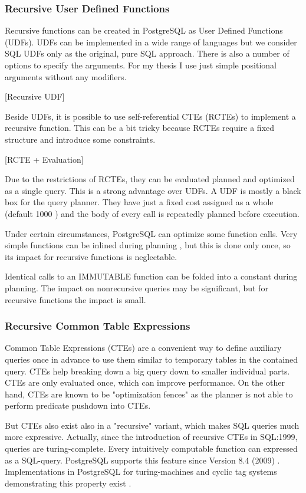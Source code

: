 \subsubsection{Recursive User Defined Functions}
Recursive functions can be created in PostgreSQL as User Defined Functions (UDFs). UDFs can be implemented in a wide range of languages but we consider SQL UDFs only as the original, pure SQL approach. There is also a number of options to specify the arguments. For my thesis I use just simple positional arguments without any modifiers.

[Recursive UDF]

Beside UDFs, it is possible to use self-referential CTEs (RCTEs) to implement a recursive function. This can be a bit tricky because RCTEs require a fixed structure and introduce some constraints.

[RCTE + Evaluation]

Due to the restrictions of RCTEs, they can be evaluated planned and optimized as a single query. This is a strong advantage over UDFs. A UDF is mostly a black box for the query planner. They have just a fixed cost assigned as a whole (default 1000 \cite[p. 1435]{psql}) and the body of every call is repeatedly planned before execution.

Under certain circumstances, PostgreSQL can optimize some function calls. Very simple functions can be inlined during planning \cite{psqlWikiUDFinlining}, but this is done only once, so its impact for recursive functions is neglectable. 

Identical calls to an IMMUTABLE function can be folded into a constant during planning. The impact on nonrecursive queries may be significant, but for recursive functions the impact is small.

\subsubsection{Recursive Common Table Expressions}

Common Table Expressions (CTEs) are a convenient way to define auxiliary queries once in advance to use them similar to temporary tables in the contained query. CTEs help breaking down a big query down to smaller individual parts. CTEs are only evaluated once, which can improve performance. On the other hand, CTEs are known to be "optimization fences" as the planner is not able to perform predicate pushdown into CTEs.

But CTEs also exist also in a "recursive" variant, which makes SQL queries much more expressive. Actually, since the introduction of recursive CTEs in SQL:1999, queries are turing-complete. Every intuitively computable function can expressed as a SQL-query. PostgreSQL supports this feature since Version 8.4 (2009) \cite[p. 2811]{psql}. Implementations in PostgreSQL for turing-machines and cyclic tag systems demonstrating this property exist \cite{psqlWikiCTS, psqlWikiTM}.

